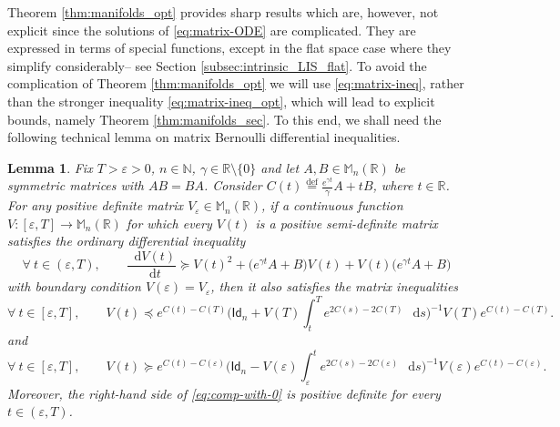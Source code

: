 \documentclass[a4paper,twoside,11pt,reqno]{amsart}
\newcommand{\eqdef}{\stackrel{\mathrm{def}}{=}}
\newtheorem{lemma}[theorem]{Lemma}
\newcommand*\diff{\mathop{}\!\mathrm{d}}
\newcommand{\R}{\mathbb{R}} %
\newcommand{\N}{\mathbb{N}}
\newcommand{\e}{\varepsilon}
\newcommand{\msf}{\mathsf}
\begin{document}
Theorem \ref{thm:manifolds_opt} provides sharp results which are, however, not explicit since the solutions of \eqref{eq:matrix-ODE} are complicated. They are expressed in terms of special functions, except in the flat space case where they simplify considerably-- see Section \ref{subsec:intrinsic_LIS_flat}. To avoid the complication of Theorem \ref{thm:manifolds_opt} we will use \eqref{eq:matrix-ineq}, rather than the stronger inequality \eqref{eq:matrix-ineq_opt}, which will lead to explicit bounds, namely Theorem \ref{thm:manifolds_sec}. To this end, we shall need the following technical lemma on matrix Bernoulli differential inequalities.

\begin{lemma} \label{lem:bernoulli}
Fix $T>\e>0$, $n\in\N$, $\gamma\in\R\setminus\{0\}$ and let $A,B\in \mathbb M_n(\R)$ be symmetric matrices with $AB=BA$. Consider $C(t) \eqdef  \tfrac{e^{\gamma t}}{\gamma}A+tB$, where $t\in\R$. For any positive definite matrix $V_\e\in\mathbb M_n(\R)$, if a continuous function $V:[\e,T]\to\mathbb M_n(\R)$ for which every $V(t)$ is a positive semi-definite matrix satisfies the ordinary differential inequality
\begin{equation} \label{eq:ODE}
\forall \ t\in(\e,T),\qquad \frac{\diff V(t)}{\diff t} \succeq V(t)^2 + \big(e^{\gamma t}A+B\big) V(t) + V(t) \big( e^{\gamma t}A+B\big)
\end{equation}
with boundary condition $V(\e)=V_\e$, then it also satisfies the matrix inequalities
\begin{equation} \label{eq:comp-with-T}
\forall \ t\in[\e,T], \qquad V(t) \preceq e^{C(t)-C(T)} \Big( \msf{Id} _n+ V(T) \int_t^{T} e^{2C(s)-2C(T)}\,\diff s \Big)^{-1} V(T) e^{C(t)-C(T)}.
\end{equation}
and
\begin{equation} \label{eq:comp-with-0}
\forall \ t\in[\e,T],\qquad V(t) \succeq e^{C(t)-C(\e)} \Big( \msf{Id}_n - V(\e) \int_\e^t e^{2C(s)-2C(\e)}\,\diff s\Big)^{-1} V(\e) e^{C(t)-C(\e)}.
\end{equation}
Moreover, the right-hand side of \eqref{eq:comp-with-0} is positive definite for every $t\in(\e,T)$.
\end{lemma}
\end{document}
